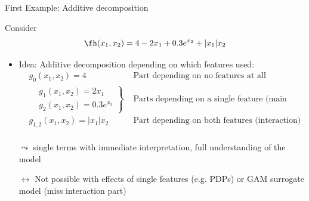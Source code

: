 \documentclass[11pt,compress,t,notes=noshow, aspectratio=169, xcolor=table]{beamer}
\begin{document}
\begin{frame}{First Example: Additive decomposition}

    \begin{example}

    Consider
    $$
    \fh(x_1, x_2) = 4 - 2x_1 + 0.3 e^{x_2} + |x_1|x_2
    $$

    \begin{itemize}
        \item Idea: Additive decomposition depending on which features used:
        \begin{equation}\label{eq:func_decomp_first_min_example}
        \begin{aligned}
            & g_0(x_1, x_2) = 4 & \text{ Part depending on no features at all (intercept)}  \\
            &
            \left.\begin{aligned}
                & g_1(x_1, x_2) = 2x_1 \\
                & g_2(x_1, x_2) = 0.3 e^{x_2}
            \end{aligned}\right\}
                & \text{ Parts depending on a single feature (main effects)}  \\
            & g_{1,2}(x_1, x_2) = |x_1|x_2 & \text{ Part depending on both features (interaction)}  \\
        \end{aligned}
        \end{equation}
        \item[$\leadsto$] single terms with immediate interpretation, full understanding of the model
        
        \item[$\leftrightarrow$] Not possible with effects of single features (e.g. PDPs) or GAM surrogate model (miss interaction part)
    
        
        
    \end{itemize}

    \end{example}

\end{frame}
\end{document}
